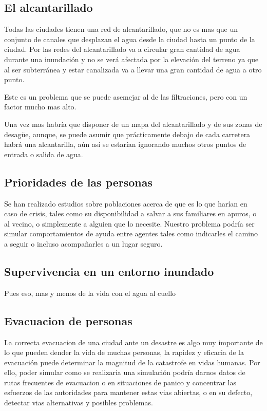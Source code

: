 \subsection*{El alcantarillado}
Todas las ciudades tienen una red de alcantarillado, que no es mas que un
conjunto de canales que desplazan el agua desde la ciudad hasta un punto de la
ciudad. Por las redes del alcantarillado va a circular gran cantidad de agua
durante una inundación y no se verá afectada por la elevación del terreno ya
que al ser subterránea y estar canalizada va a llevar una gran cantidad de agua
a otro punto.

Este es un problema que se puede asemejar al de las filtraciones, pero con un
factor mucho mas alto.

Una vez mas habría que disponer de un mapa del alcantarillado y de sus zonas de
desagüe, aunque, se puede asumir que prácticamente debajo de cada carretera
habrá una alcantarilla, aún así se estarían ignorando muchos otros puntos de
entrada o salida de agua.

\subsection*{Prioridades de las personas}

Se han realizado estudios \cite{prioridades} sobre poblaciones acerca de que es
lo que harían en caso de crisis, tales como su disponibilidad a salvar a sus
familiares en apuros, o al vecino, o simplemente a alguien que lo necesite.
Nuestro problema podría ser simular comportamientos de ayuda entre agentes
tales como indicarles el camino a seguir o incluso acompañarles a un lugar
seguro.

\subsection*{Supervivencia en un entorno inundado}
Pues eso, mas y menos de la vida con el agua al cuello

\subsection*{Evacuacion de personas}
La correcta evacuacion de una ciudad ante un desastre es algo muy importante de
lo que pueden dender la vida de muchas personas, la rapidez y eficacia de la
evacuación puede determinar la magnitud de la catastrofe en vidas humanas. Por
ello, poder simular como se realizaria una simulación podría darnos datos de
rutas frecuentes de evacuacion \cite{evac08} o en situaciones de panico
\cite{panicevac} y concentrar las esfuerzos de las autoridades para mantener
estas vias abiertas, o en su defecto, detectar vias alternativas y posibles
problemas.

